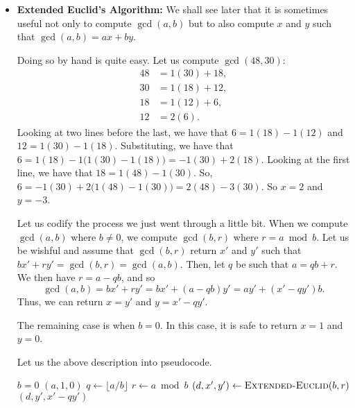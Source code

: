 \documentclass{article}
\begin{document}
\begin{itemize}
\item {\bf Extended Euclid's Algorithm:} We shall see later that it is sometimes useful not only to compute $\gcd(a,b)$ but to also compute $x$ and $y$ such that $\gcd(a,b) = ax + by$.

Doing so by hand is quite easy. Let us compute $\gcd(48, 30)$:
\begin{align*}
48 &= 1(30) + 18,\\
30 &= 1(18) + 12,\\
18 &= 1(12) + 6,\\
12 &= 2(6).
\end{align*}
Looking at two lines before the last, we have that $6 = 1(18) - 1(12)$ and $12 = 1(30) - 1(18)$. Substituting, we have that $6 = 1(18) - 1\big(1(30) - 1(18)\big) = -1(30) + 2(18)$. Looking at the first line, we have that $18 = 1(48) - 1(30)$. So, $6 = -1(30) + 2\big( 1(48) - 1(30) \big) = 2(48) - 3(30)$. So $x = 2$ and $y = -3$.

Let us codify the process we just went through a little bit. When we compute $\gcd(a,b)$ where $b \neq 0$, we compute $\gcd(b, r)$ where $r = a \bmod b$. Let us be wishful and assume that $\gcd(b, r)$ return $x'$ and $y'$ such that $bx' + ry' = \gcd(b, r) = \gcd(a,b)$. Then, let $q$ be such that $a = qb+r$. We then have $r = a - qb$, and so
$$\gcd(a,b) = bx' + ry' = bx' + (a - qb)y' = ay' + (x' - qy')b.$$
Thus, we can return $x = y'$ and $y = x' - qy'$.

The remaining case is when $b = 0$. In this case, it is safe to return $x = 1$ and $y = 0$.

Let us the above description into pseudocode.

\begin{codebox}
\li \If $b = 0$
\li     \Then \Return $(a,1,0)$
\li     \Else
              $q \gets \lfloor a/b \rfloor$
\li           $r \gets a \bmod b$
\li           $(d, x', y') \gets \textnormal{\scshape Extended-Euclid}(b, r)$
\li           \Return $(d, y', x'-qy')$
        \End
\end{codebox}
\end{itemize}
\end{document}
